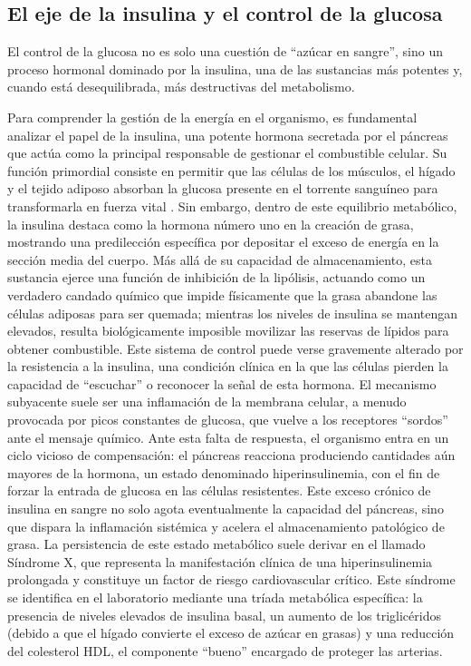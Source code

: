 \documentclass[
  spanish,
]{article}
\begin{document}
\subsection{El eje de la insulina y el control de la glucosa}\label{el-eje-de-la-insulina-y-el-control-de-la-glucosa}

El control de la glucosa no es solo una cuestión de ``azúcar en sangre'', sino un proceso hormonal dominado por la insulina, una de las sustancias más potentes y, cuando está desequilibrada, más destructivas del metabolismo.

Para comprender la gestión de la energía en el organismo, es fundamental analizar el papel de la insulina, una potente hormona secretada por el páncreas que actúa como la principal responsable de gestionar el combustible celular. Su función primordial consiste en permitir que las células de los músculos, el hígado y el tejido adiposo absorban la glucosa presente en el torrente sanguíneo para transformarla en fuerza vital
. Sin embargo, dentro de este equilibrio metabólico, la insulina destaca como la hormona número uno en la creación de grasa, mostrando una predilección específica por depositar el exceso de energía en la sección media del cuerpo. Más allá de su capacidad de almacenamiento, esta sustancia ejerce una función de inhibición de la lipólisis, actuando como un verdadero candado químico que impide físicamente que la grasa abandone las células adiposas para ser quemada; mientras los niveles de insulina se mantengan elevados, resulta biológicamente imposible movilizar las reservas de lípidos para obtener combustible.
Este sistema de control puede verse gravemente alterado por la resistencia a la insulina, una condición clínica en la que las células pierden la capacidad de ``escuchar'' o reconocer la señal de esta hormona. El mecanismo subyacente suele ser una inflamación de la membrana celular, a menudo provocada por picos constantes de glucosa, que vuelve a los receptores ``sordos'' ante el mensaje químico. Ante esta falta de respuesta, el organismo entra en un ciclo vicioso de compensación: el páncreas reacciona produciendo cantidades aún mayores de la hormona, un estado denominado hiperinsulinemia, con el fin de forzar la entrada de glucosa en las células resistentes. Este exceso crónico de insulina en sangre no solo agota eventualmente la capacidad del páncreas, sino que dispara la inflamación sistémica y acelera el almacenamiento patológico de grasa.
La persistencia de este estado metabólico suele derivar en el llamado Síndrome X, que representa la manifestación clínica de una hiperinsulinemia prolongada y constituye un factor de riesgo cardiovascular crítico. Este síndrome se identifica en el laboratorio mediante una tríada metabólica específica: la presencia de niveles elevados de insulina basal, un aumento de los triglicéridos (debido a que el hígado convierte el exceso de azúcar en grasas) y una reducción del colesterol HDL, el componente ``bueno'' encargado de proteger las arterias.
\end{document}
